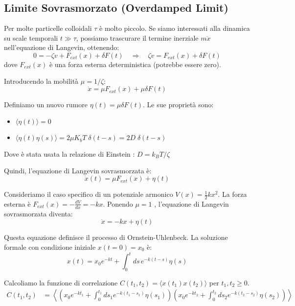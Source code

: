 \subsection{Limite Sovrasmorzato (Overdamped Limit)}
Per molte particelle colloidali $\tau$ è molto piccolo. Se siamo interessati alla dinamica su scale temporali $t \gg \tau$, possiamo trascurare il termine inerziale $m \ddot{x}$ nell'equazione di Langevin, ottenendo:
\begin{equation}
0 = -\zeta v + F_{ext}(x) + \delta F(t) \quad \Rightarrow \quad \zeta v = F_{ext}(x) + \delta F(t)
\end{equation}
dove $F_{ext}(x)$ è una forza esterna deterministica (potrebbe essere zero).

Introducendo la mobilità $\mu = 1/\zeta$:
\begin{equation}
\dot{x} = \mu F_{ext}(x) + \mu \delta F(t)
\end{equation}

Definiamo un nuovo rumore $\eta(t) = \mu \delta F(t)$. Le sue proprietà sono:
\begin{itemize}
    \item $\langle \eta(t) \rangle =  0$
    \item $\langle \eta(t) \eta(s) \rangle = 2 \mu K_b T \; \delta(t-s)= 2 D \; \delta(t-s)$
\end{itemize}
Dove è stata usata la relazione di Einstein : $D = k_B T / \zeta$

Quindi, l'equazione di Langevin sovrasmorzata è:
\begin{equation}
\dot{x}(t) = \mu F_{ext}(x) + \eta(t)
\end{equation}

Consideriamo il caso specifico di un potenziale armonico $V(x) = \frac{1}{2} k x^2$.
La forza esterna è $F_{ext}(x) = -\frac{dV}{dx} = -kx$.
Ponendo $\mu=1$ , l'equazione di Langevin sovrasmorzata diventa:
\begin{equation}
\dot{x} = - k x + \eta(t)
\end{equation}

Questa equazione definisce il processo di Ornstein-Uhlenbeck. La soluzione formale con condizione iniziale $x(t=0)=x_0$ è:
\begin{equation}
x(t) = x_0 e^{-k t} + \int_0^t ds \, e^{-k(t-s)} \eta(s)
\end{equation}

Calcoliamo la funzione di correlazione $C(t_1, t_2)=\langle x(t_1) x(t_2) \rangle$  per $t_1, t_2 \ge 0$.
\begin{equation}
\begin{aligned}
C(t_1, t_2) &= \left\langle \left( x_0 e^{-k t_1} + \int_0^{t_1} ds_1 e^{-k(t_1-s_1)} \eta(s_1) \right) \left( x_0 e^{-k t_2} + \int_0^{t_2} ds_2 e^{-k(t_2-s_2)} \eta(s_2) \right) \right\rangle
\end{aligned}
\end{equation}

